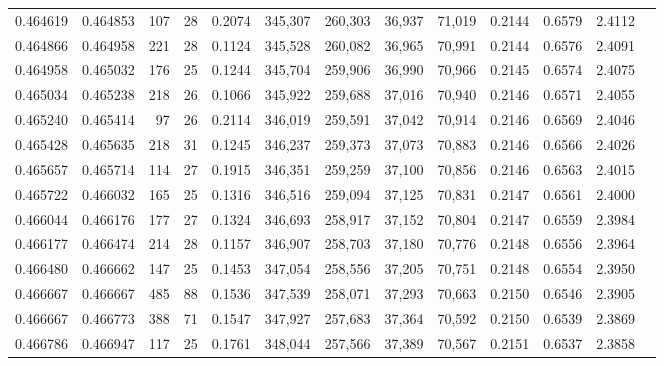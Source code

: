 \begin{tabular}{rrrrrrrrrrrrr}
0.464619 & 0.464853 &    107 &    28 &                                     0.2074 & 345,307 & 260,303 &  36,937 &  71,019 & 0.2144 & 0.6579 & 2.4112 \\
0.464866 & 0.464958 &    221 &    28 &                                     0.1124 & 345,528 & 260,082 &  36,965 &  70,991 & 0.2144 & 0.6576 & 2.4091 \\
0.464958 & 0.465032 &    176 &    25 &                                     0.1244 & 345,704 & 259,906 &  36,990 &  70,966 & 0.2145 & 0.6574 & 2.4075 \\
0.465034 & 0.465238 &    218 &    26 &                                     0.1066 & 345,922 & 259,688 &  37,016 &  70,940 & 0.2146 & 0.6571 & 2.4055 \\
0.465240 & 0.465414 &     97 &    26 &                                     0.2114 & 346,019 & 259,591 &  37,042 &  70,914 & 0.2146 & 0.6569 & 2.4046 \\
0.465428 & 0.465635 &    218 &    31 &                                     0.1245 & 346,237 & 259,373 &  37,073 &  70,883 & 0.2146 & 0.6566 & 2.4026 \\
0.465657 & 0.465714 &    114 &    27 &                                     0.1915 & 346,351 & 259,259 &  37,100 &  70,856 & 0.2146 & 0.6563 & 2.4015 \\
0.465722 & 0.466032 &    165 &    25 &                                     0.1316 & 346,516 & 259,094 &  37,125 &  70,831 & 0.2147 & 0.6561 & 2.4000 \\
0.466044 & 0.466176 &    177 &    27 &                                     0.1324 & 346,693 & 258,917 &  37,152 &  70,804 & 0.2147 & 0.6559 & 2.3984 \\
0.466177 & 0.466474 &    214 &    28 &                                     0.1157 & 346,907 & 258,703 &  37,180 &  70,776 & 0.2148 & 0.6556 & 2.3964 \\
0.466480 & 0.466662 &    147 &    25 &                                     0.1453 & 347,054 & 258,556 &  37,205 &  70,751 & 0.2148 & 0.6554 & 2.3950 \\
0.466667 & 0.466667 &    485 &    88 &                                     0.1536 & 347,539 & 258,071 &  37,293 &  70,663 & 0.2150 & 0.6546 & 2.3905 \\
0.466667 & 0.466773 &    388 &    71 &                                     0.1547 & 347,927 & 257,683 &  37,364 &  70,592 & 0.2150 & 0.6539 & 2.3869 \\
0.466786 & 0.466947 &    117 &    25 &                                     0.1761 & 348,044 & 257,566 &  37,389 &  70,567 & 0.2151 & 0.6537 & 2.3858 \\

\end{tabular}
